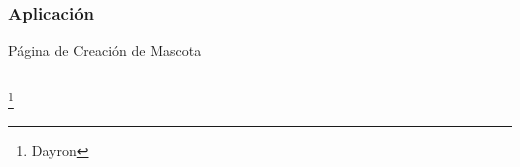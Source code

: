\documentclass[14pt]{beamer}
\begin{document}
\begin{frame}
\frametitle{Aplicación}
Página de Creación de Mascota
\begin{columns}
\begin{column}{0.25\textwidth}
\begin{center}


\end{center}
\end{column}

\end{columns}
\footnote{Dayron}
\end{frame}
\end{document}
